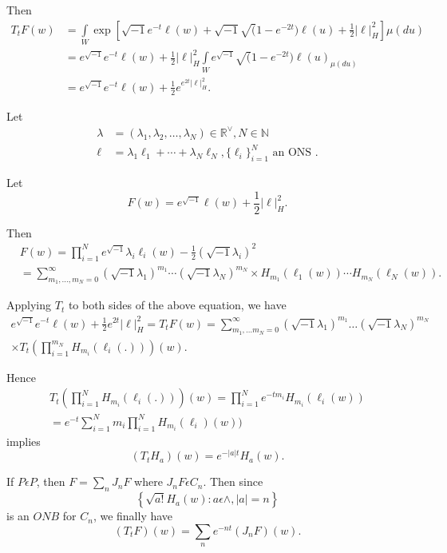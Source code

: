 Then 
\begin{align*}
  T_t F(w) & =  \int\limits_W \exp \left[\sqrt{-1}e^{-t}\ell (w)+ \sqrt{-1}
    \surd  (1-e^{-2t})\ell (u)+ \frac{1}{2}|\ell |^2_H\right] \mu (du)\\ 
  & = e^{\sqrt{-1}} e^{-t} \ell (w) + \frac{1}{2} | \ell |^2_H
  \int\limits_W e^{\sqrt{-1}} \surd (1-e^{-2t}) \ell (u)_{\mu (du)}
  \\ 
  & = e^{\sqrt{-1}} e^{-t}\ell (w) + \frac{1}{2}e^{e^{2t}|\ell |^2_H}.
\end{align*}

Let 
\begin{align*}
  \lambda & = (\lambda_1, \lambda_2, \ldots, \lambda_N )\in
  \mathbb{R}^\vee, N \in \mathbb{N}\\ 
  \ell & = \lambda_1 \ell_1 +\cdots + \lambda_N \ell_N, \{ \ell_i
  \}^N_{i=1} \text { an ONS }.  
\end{align*}

Let 
$$
F(w) = e^{\sqrt{-1}}\ell (w)+ \frac{1}{2}|\ell|^2_H.
$$

Then 
\begin{align*}
  &F(w)  =  \prod^N_{i=1} e^{\sqrt{-1}}\lambda_i \ell_i(w) -
  \frac{1}{2}(\sqrt{-1}\lambda_i)^2 \\ 
  & = \sum^{\infty}_{m_1, \ldots, m_N=0}(\sqrt{-1} \lambda_1)^{m_1}
  \cdots (\sqrt{-1} \lambda_N)^{m_N} 
  \times H_{m_1}(\ell_1(w))\cdots H_{m_N}(\ell_N(w)).
\end{align*}

Applying $T_t$ to both sides of the above equation, we have 
{\fontsize{10pt}{12pt}\selectfont
\begin{multline*}
  e^{\sqrt{-1}} e^{-t}\ell (w) +\frac{1}{2} e^{2t}|\ell |^2_H= T_t  F(w) 
  = \sum^\infty_{m_1,\ldots m_N = 0}(\sqrt{-1}\lambda_1)^{m_1}\ldots
  (\sqrt{-1}\lambda_N)^{m_N}\\
 \times T_t \left(\prod^{m_N}_{i = 1} H_{m_i}(\ell_i (.))\right) (w).
\end{multline*}}\relax\pageoriginale

Hence 
\begin{gather*}
  T_t \left(\prod^N_{i = 1} H_{m_i}(\ell _i(.))\right) (w) = \prod^N _{i = 1}
  e^{-tm_i}H_{m_i}(\ell_i (w))\\ 
  = e ^{-t} \sum^N _{i = 1} m_i \prod^N _{i=1} H_{m_i}(\ell_i)(w))
\end{gather*}
implies 
$$
(T_t H_a)(w) = e^{-|a| t}H_a(w). 
$$

If $P \epsilon  P $, then $F = \sum_n J_n F$ where $J_n F
\epsilon  C_n$. Then since  
$$
\left\{\sqrt{a!}H_a (w): a \epsilon  \wedge, |a| = n\right\}
$$
is an $ONB$ for $C_n$, we finally have 
$$
(T_t F)(w) = \sum_n e^{-nt}(J_n F)(w).
$$

